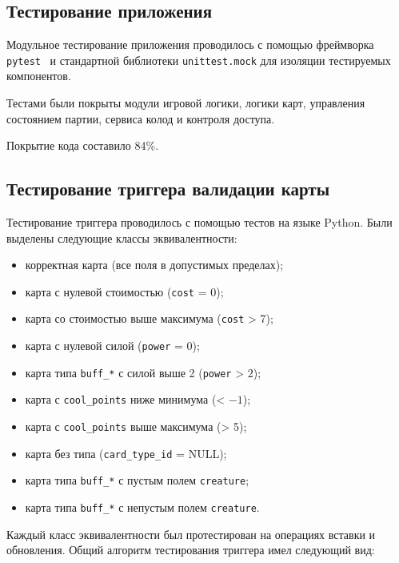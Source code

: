 \subsection{Тестирование приложения}

Модульное тестирование приложения проводилось с помощью фреймворка
\texttt{pytest}~\cite{pytest} и стандартной библиотеки
\texttt{unittest.mock} для изоляции тестируемых компонентов.

Тестами были покрыты модули игровой логики, логики карт, управления
состоянием партии, сервиса колод и контроля доступа.

Покрытие кода составило 84\%.

\subsection{Тестирование триггера валидации карты}

Тестирование триггера проводилось с помощью тестов на языке Python.
Были выделены следующие классы эквивалентности:

\begin{itemize}
	\item корректная карта (все поля в допустимых пределах);
	\item карта с нулевой стоимостью (\texttt{cost} = 0);
	\item карта со стоимостью выше максимума (\texttt{cost} > 7);
	\item карта с нулевой силой (\texttt{power} = 0);
	\item карта типа \texttt{buff\_*} с силой выше 2 (\texttt{power} > 2);
	\item карта с \texttt{cool\_points} ниже минимума (< $-1$);
	\item карта с \texttt{cool\_points} выше максимума (> 5);
	\item карта без типа (\texttt{card\_type\_id} = NULL);
	\item карта типа \texttt{buff\_*} с пустым полем \texttt{creature};
	\item карта типа \texttt{buff\_*} с непустым полем \texttt{creature}.
\end{itemize}

Каждый класс эквивалентности был протестирован на операциях вставки
и обновления. Общий алгоритм тестирования триггера имел следующий вид:

